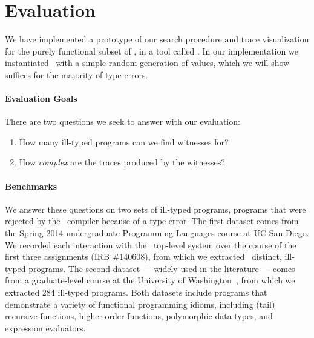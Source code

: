 \section{Evaluation}
\label{sec:evaluation}

We have implemented a prototype of our search procedure and trace
visualization for the purely functional subset of \ocaml, in a tool called \nanomaly.
In our implementation we instantiated \gensym\ with a simple random
generation of values, which we will show suffices for the
majority of type errors.

\paragraph{Evaluation Goals}
%
There are two questions we seek to answer with our evaluation:
%
\begin{enumerate}
\item {}
      How many ill-typed programs can we find witnesses for?
\item {}
      How \emph{complex} are the traces produced by the witnesses?
\end{enumerate}

\paragraph{Benchmarks}
We answer these questions on two sets of ill-typed programs, \ie
programs that were rejected by the \ocaml\ compiler because of a
type error.
%
The first dataset comes from the Spring 2014 undergraduate Programming
Languages course at UC San Diego.
%
We recorded each interaction with the \ocaml\ top-level system over the
course of the first three assignments (IRB  
\#140608),
from which we extracted \ucsdsize\ distinct, ill-typed \ocaml programs.
%
The second dataset --- widely used in the literature --- comes from a
graduate-level course at the University of Washington~\cite{Lerner2006-pj},
from which we extracted 284 ill-typed programs.
%
Both datasets include programs that demonstrate a variety of functional
programming idioms, including (tail) recursive functions, higher-order
functions, polymorphic data types, and expression evaluators.

